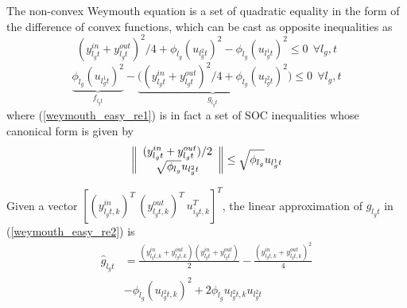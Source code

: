 \documentclass[journal]{IEEEtran}
\begin{document}
The non-convex Weymouth equation is a set of quadratic equality in the form of the difference of convex functions, which can be cast as opposite inequalities as
\begin{equation}\label{weymouth_easy_re1}
(y_{l_gt}^{in}+y_{l_gt}^{out})^2/4 + \phi_{l_g}(u_{l_g^2t})^2 - \phi_{l_g}(u_{l_g^1t})^2 \le 0~~\forall l_g,t
\end{equation}
\begin{equation}\label{weymouth_easy_re2}
  \underbrace{\phi_{l_g}(u_{l_g^1t})^2}_{f_{l_gt}}-\underbrace{((y_{l_gt}^{in}+y_{l_gt}^{out})^2/4+\phi_{l_g}(u_{l_g^2t})^2}_{g_{l_gt}})\le 0~~\forall l_g,t
\end{equation}
where (\ref{weymouth_easy_re1}) is in fact a set of SOC inequalities whose canonical form is given by
\begin{equation}
\label{weymouth_socp}
\left\|  \begin{array}{*{20}c}
   (y_{l_gt}^{in}+y_{l_gt}^{out})/2  \\
   \sqrt{\phi_{l_g}} u_{l_g^2t}  \\
\end{array}   \right\|  \le  \sqrt{\phi_{l_g}} u_{l_g^1t}
\end{equation}

Given a vector $[(y_{l_gt,k}^{in})^T~(y_{l_gt,k}^{out})^T~u_{i_gt,k}^T]^T$, the linear approximation of $g_{l_gt}$ in (\ref{weymouth_easy_re2}) is
\begin{equation}
\begin{split}
\label{wey_easy_re2g}
  \hat{g}_{l_gt}&=\frac{(y_{l_gt,k}^{in}+y_{l_gt,k}^{out})(y_{l_gt}^{in}+y_{l_gt}^{out})}{2}-\frac{(y_{l_gt,k}^{in}+y_{l_gt,k}^{out})^2}{4}\\
  &-\phi_{l_g}(u_{l_g^2t,k})^2+2\phi_{l_g}u_{l_g^2t,k}u_{l_g^2t}
\end{split}
\end{equation}
\end{document}
